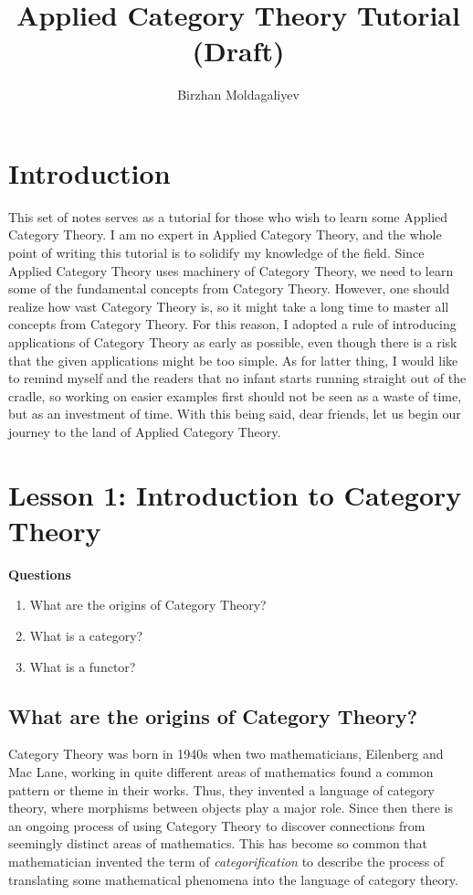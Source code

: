 \documentclass{report}
\author{Birzhan Moldagaliyev}
\title{Applied Category Theory Tutorial (Draft)}
\theoremstyle{definition}
\begin{document}
\maketitle
\chapter*{Introduction}
This set of notes serves as a tutorial for those who wish to learn some Applied Category Theory. I am no expert in Applied Category Theory, and the whole point of writing this tutorial is to solidify my knowledge of the field. Since Applied Category Theory uses machinery of Category Theory, we need to learn some of the fundamental concepts from Category Theory. However, one should realize how vast Category Theory is, so it might take a long time to master all concepts from Category Theory. For  this reason, I adopted a rule of introducing applications of Category Theory as early as possible, even though there is a risk that the given applications might be too simple. As for latter thing, I would like to remind myself and the readers that no infant starts running straight out of the cradle, so working on easier examples first should not be seen as a waste of time, but as an investment of time. With this being said, dear friends, let us begin our journey to the land of Applied Category Theory.  

\chapter*{Lesson 1: Introduction to Category Theory}
\textbf{Questions}\\
\begin{enumerate}
	\item What are the origins of Category Theory?
	\item What is a category?
	\item What is a functor?
\end{enumerate}


\section*{What are the origins of Category Theory?}
Category Theory was born in 1940s when two mathematicians, Eilenberg and Mac Lane, working in quite different areas of mathematics found a common pattern or theme in their works. Thus, they invented a language of category theory, where morphisms between objects play a major role. Since then there is an ongoing process of using Category Theory to discover connections from seemingly distinct areas of mathematics. This has become so common that mathematician invented the term of \emph{categorification} to describe the process of translating some mathematical phenomena into the language of category theory. 
\end{document}
